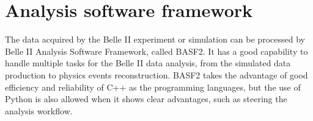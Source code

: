 \begin{comment}
The mixing of background is then implemented to provide a realistic view of physical events and beam background overlay. Since the format of beam background is simulated hits, thus adding the background events is done by injecting the simulated hits, then move to the digitization of hits to detector responses. In a event time window $\Delta t$, assuming the given type background has a average rate of $R$, the mixing number of background hits in such event is: 

\begin{equation}
\bar{N} = sR\Delta{t}
\end{equation}

$s$ is optional scaling factor which can be used to study the influence of given type background in different level. Because $R$ is averaged value, in the actual mixing, the number of $\bar{N}$ is used as the expected value of Poisson distribution, which presents the number of observed events when many trials of such events is made with certain small possibility per event.  In order to simulate the effect of timing different of background and physical events, the mixing timing window over $\Delta t$ is randomly shift according to the physical events.
With the real experimental data comes in handy, the method of adding background events to physics events is slightly different since using real beam background can provide a more precise result than simulation. By setting a random trigger for beam background, the hits digitization from real beam background will be collected and add to simulated physics events. Although the pile-up noise collected in this method is not very precise because of the threshold set for detectors allowing only part of noise to be added, the non-recorded noise can still contribute to the pile-up noise for physics events, and they are not included in this method. Yet overall it provides a more realistic evaluation of beam background overlay.

\end{comment}

\section{Analysis software framework} 
The data acquired by the Belle II experiment or simulation can be processed by  Belle II Analysis Software Framework, called BASF2. It has a good capability to handle multiple tasks for the Belle II data analysis, from the simulated data production to physics events reconstruction. BASF2 takes the advantage of good efficiency and reliability of C++ as the programming languages, but the use of
Python is also allowed when it shows clear advantages, such as steering the analysis workflow. 

